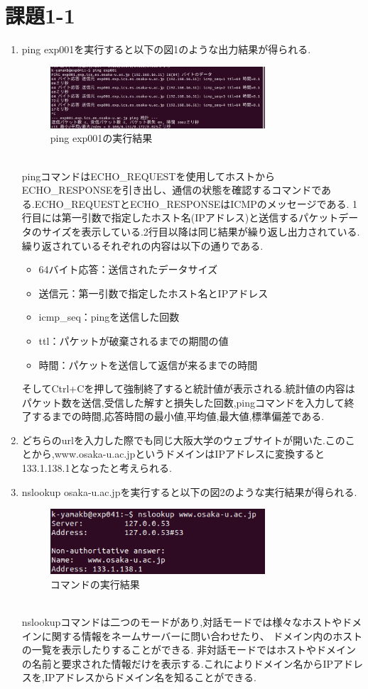 \documentclass[dvipdfmx]{jarticle}
\begin{document}
\section{課題1-1}
\begin{enumerate}
    \item ping exp001を実行すると以下の図1のような出力結果が得られる.
    \begin{figure}[h]
        \centering
        \includegraphics[width=8cm]{1-1-1.png}
        \caption{ping exp001の実行結果}
    \end{figure}
    \\pingコマンドはECHO\_REQUESTを使用してホストからECHO\_RESPONSEを引き出し、通信の状態を確認するコマンドである.ECHO\_REQUESTとECHO\_RESPONSEはICMPのメッセージである.
    1行目には第一引数で指定したホスト名(IPアドレス)と送信するパケットデータのサイズを表示している.2行目以降は同じ結果が繰り返し出力されている.
    繰り返されているそれぞれの内容は以下の通りである.
    \begin{itemize}
        \item 64バイト応答：送信されたデータサイズ
        \item 送信元：第一引数で指定したホスト名とIPアドレス
        \item icmp\_seq：pingを送信した回数
        \item ttl：パケットが破棄されるまでの期間の値
        \item 時間：パケットを送信して返信が来るまでの時間
    \end{itemize}
    そしてCtrl+Cを押して強制終了すると統計値が表示される.統計値の内容はパケット数を送信,受信した解すと損失した回数,pingコマンドを入力して終了するまでの時間,応答時間の最小値,平均値,最大値,標準偏差である.
    \item どちらのurlを入力した際でも同じ大阪大学のウェブサイトが開いた.このことから,www.osaka-u.ac.jpというドメインはIPアドレスに変換すると133.1.138.1となったと考えられる.
    \item nslookup osaka-u.ac.jpを実行すると以下の図2のような実行結果が得られる.
    \begin{figure}[h]
        \centering
        \includegraphics[width=8cm]{1-1-3.png}
        \caption{コマンドの実行結果}
    \end{figure}
    \\nslookupコマンドは二つのモードがあり,対話モードでは様々なホストやドメインに関する情報をネームサーバーに問い合わせたり、 ドメイン内のホストの一覧を表示したりすることができる.
    非対話モードではホストやドメインの名前と要求された情報だけを表示する.これによりドメイン名からIPアドレスを,IPアドレスからドメイン名を知ることができる.
\end{enumerate}
\end{document}
